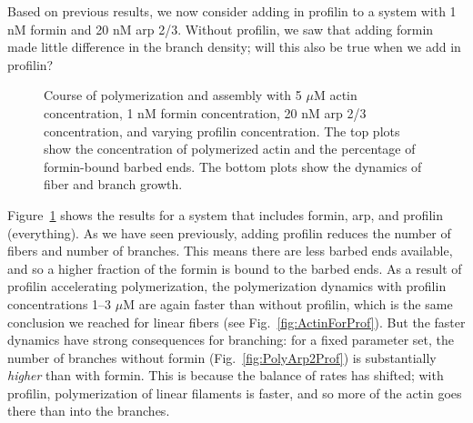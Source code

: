 \documentclass[11pt]{article}
\begin{document}
\iffalse
\begin{figure}
\centering
\texttt{[image: FibLengthsArpFormin.eps]}
\texttt{[image: BranchLengthsArpFormin.eps]}
\caption{\label{fig:LengthDistsArpFormin} The length distribution of filaments with 5 $\mu$M actin concentration, 1 nM formin, and various concentrations of arp 2/3 (2 nM at left, 20 nM in the middle, and 200 nM at right). We separate the filaments into linear and mother filaments, and show their length distribution at the top, and branches, with their length distribution at the bottom. }
\end{figure}

The length distributions in Fig.\ \ref{fig:LengthDistsArpFormin} show how the concentration of arp 2/3 sets the length of the filaments over time. At arp concentrations in the range 2--20 nM, there is initially build-up of actin into fibers with about 4000 monomers. Most of these fibers then shrink over time as monomers get taken away to form new branches, most of which are small in size. This effect is strongest at 200 nM arp 2/3, when the fibers do not build up to be as large initially (branching and nucleation happen at the same time), and most of the fibers rapidly shrink down, giving way to more branching.
\fi

Based on previous results, we now consider adding in profilin to a system with 1 nM formin and 20 nM arp 2/3. Without profilin, we saw that adding formin made little difference in the branch density; will this also be true when we add in profilin?

\begin{figure}
\centering
\caption{\label{fig:Arp20ForminProf}Course of polymerization and assembly with 5 $\mu$M actin concentration, 1 nM formin concentration, 20 nM arp 2/3 concentration, and varying profilin concentration.  The top plots show the concentration of polymerized actin and the percentage of formin-bound barbed ends. The bottom plots show the dynamics of fiber and branch growth. }
\end{figure}

Figure\ \ref{fig:Arp20ForminProf} shows the results for a system that includes formin, arp, and profilin (everything). As we have seen previously, adding profilin reduces the number of fibers and number of branches. This means there are less barbed ends available, and so a higher fraction of the formin is bound to the barbed ends. As a result of profilin accelerating polymerization, the polymerization dynamics with profilin concentrations 1--3 $\mu$M are again faster than without profilin, which is the same conclusion we reached for linear fibers (see Fig.\ \ref{fig:ActinForProf}). But the faster dynamics have strong consequences for branching: for a fixed parameter set, the number of branches without formin (Fig.\ \ref{fig:PolyArp2Prof}) is substantially \emph{higher} than with formin. This is because the balance of rates has shifted; with profilin, polymerization of linear filaments is faster, and so more of the actin goes there than into the branches. 
\end{document}
